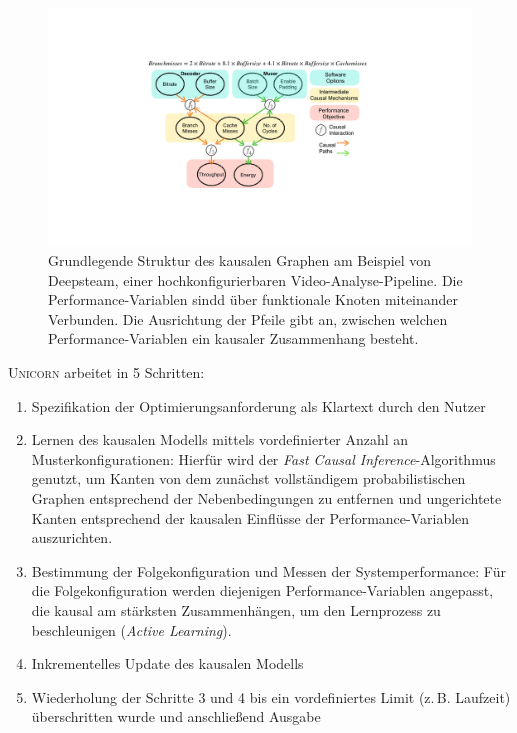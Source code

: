 \documentclass[11pt]{article}
\begin{document}
\begin{figure}[tp!]
  \centering
  \includegraphics[width=\linewidth]{./img/CausalModelExample.pdf}
  \caption{Grundlegende Struktur des kausalen Graphen am Beispiel von Deepsteam, einer hochkonfigurierbaren Video-Analyse-Pipeline. Die Performance-Variablen sindd über funktionale Knoten miteinander Verbunden. Die Ausrichtung der Pfeile gibt an, zwischen welchen Performance-Variablen ein kausaler Zusammenhang besteht.}

  \label{}
\end{figure}

\textsc{Unicorn} arbeitet in 5 Schritten:
\begin{enumerate}
  \itemsep0em
  \item Spezifikation der Optimierungsanforderung als Klartext durch den Nutzer
  \item Lernen des kausalen Modells mittels vordefinierter Anzahl an Musterkonfigurationen: Hierfür wird der \textit{Fast Causal Inference}-Algorithmus genutzt, um Kanten von dem zunächst vollständigem probabilistischen Graphen entsprechend der Nebenbedingungen zu entfernen und ungerichtete Kanten entsprechend der kausalen Einflüsse der Performance-Variablen auszurichten.
  \item Bestimmung der Folgekonfiguration und Messen der Systemperformance: Für die Folgekonfiguration werden diejenigen Performance-Variablen angepasst, die kausal am stärksten Zusammenhängen, um den Lernprozess zu beschleunigen (\textit{Active Learning}).
  \item Inkrementelles Update des kausalen Modells
  \item Wiederholung der Schritte 3 und 4 bis ein vordefiniertes Limit (z.\,B. Laufzeit) überschritten wurde und anschließend Ausgabe
\end{enumerate}
\end{document}

